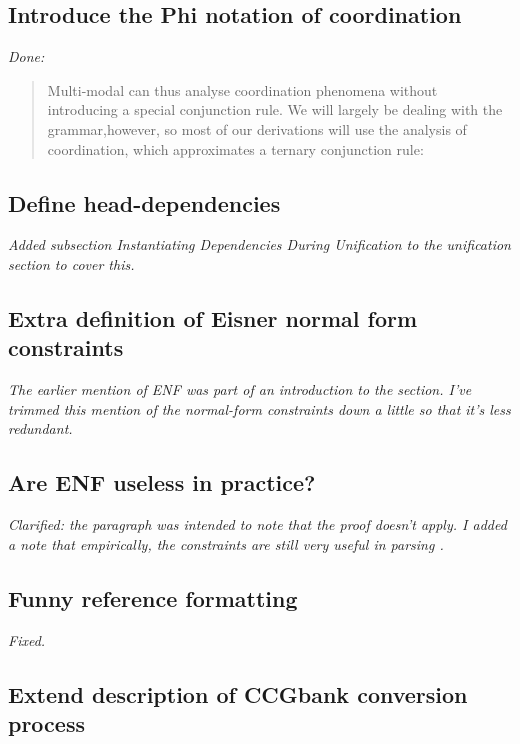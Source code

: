 \subsection{Introduce the Phi notation of coordination}

\emph{Done:}

\begin{quote}
Multi-modal \ccg can thus analyse coordination phenomena without introducing a
special
conjunction rule. We will largely be dealing with the \citet{steedman:00}
grammar,however, so most of our derivations will use the
\ccgbank analysis of coordination, which approximates a ternary conjunction
rule: 
\end{quote}


\subsection{Define head-dependencies}

\emph{Added subsection Instantiating Dependencies During Unification to the
unification section to cover this.}

\subsection{Extra definition of Eisner normal form constraints}

\emph{The earlier mention of ENF was part of an introduction to the section.
I've trimmed this mention of the normal-form constraints down a little so
that it's less redundant.}

\subsection{Are ENF useless in practice?}

\emph{Clarified: the paragraph was intended to note that the proof doesn't
apply. I added a note that empirically, the constraints are still very useful
in parsing \ccgbank.}

\subsection{Funny reference formatting}

\emph{Fixed.}

\subsection{Extend description of CCGbank conversion process}

